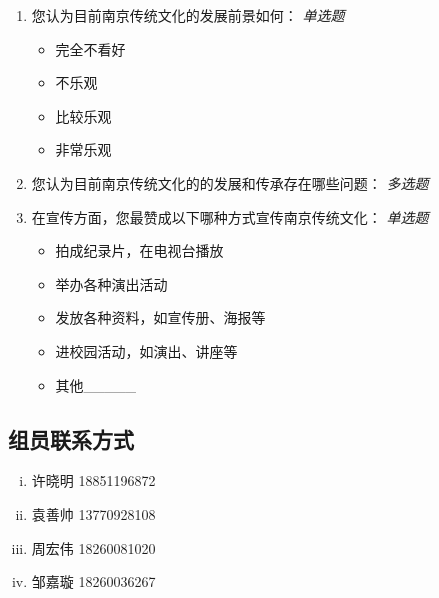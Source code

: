 \documentclass[12pt]{article}%
\begin{document}
\begin{enumerate}
       \item 您认为目前南京传统文化的发展前景如何： \emph{单选题}
       \begin{itemize}
         \item 完全不看好
         \item 不乐观
         \item 比较乐观
         \item 非常乐观
       \end{itemize}
       \item 您认为目前南京传统文化的的发展和传承存在哪些问题： \emph{多选题}
       \item 在宣传方面，您最赞成以下哪种方式宣传南京传统文化： \emph{单选题}
       \begin{itemize}
         \item 拍成纪录片，在电视台播放
         \item 举办各种演出活动
         \item 发放各种资料，如宣传册、海报等
         \item 进校园活动，如演出、讲座等
         \item 其他\_\_\_\_\_
       \end{itemize}
     \end{enumerate}

\subsection{组员联系方式}
  \begin{enumerate}[(i).]
    \item 许晓明 18851196872
    \item 袁善帅 13770928108
    \item 周宏伟 18260081020
    \item 邹嘉璇 18260036267
  \end{enumerate}
\end{document}
